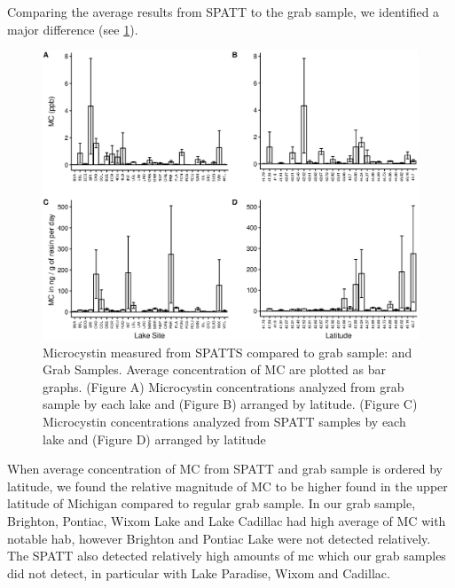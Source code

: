 Comparing the average results from SPATT to the grab sample, we identified a major difference (see \ref{fig:spattbox}). 
\begin{figure}[p]
\includegraphics[width=\textwidth]{figures/spatttboxplotlake}
\caption{
	Microcystin measured from SPATTS compared to grab sample: and Grab Samples. Average concentration of MC are plotted as bar graphs. (Figure A) Microcystin concentrations analyzed from grab sample by each lake and (Figure B) arranged by latitude. (Figure C) Microcystin concentrations analyzed from SPATT samples by each lake and (Figure D) arranged by latitude
}
\label{fig:spattbox}
\end{figure}
When average concentration of MC from SPATT and grab sample is ordered by latitude, we found the relative magnitude of MC to be higher found in the upper latitude of Michigan compared to regular grab sample. In our grab sample, Brighton, Pontiac, Wixom Lake and Lake Cadillac had high average of MC with notable \gls{hab}, however Brighton and Pontiac Lake were not detected relatively. The SPATT also detected relatively high amounts of \gls{mc} which our grab samples did not detect, in particular with Lake Paradise, Wixom and Cadillac. 


